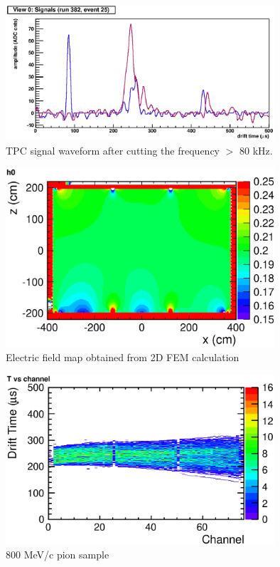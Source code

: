\documentclass{cernyrep}
\begin{document}
\begin{figure}[htbp]
 \begin{center}
  \includegraphics[width=100mm]{afterFFT.eps}
 \end{center}
 \caption{TPC signal waveform after cutting the frequency $>$ 80 kHz.}
 \label{Fig:afterFFT}
\end{figure}


\begin{figure}[htbp]
 \begin{center}
  \includegraphics[width=100mm]{2DFieldMap.eps}
 \end{center}
 \caption{Electric field map obtained from 2D FEM calculation}
 \label{fig:2DFieldMap}
\end{figure}

\begin{figure}[htbp]
 \begin{center}
  \includegraphics[width=100mm]{PionTrack.eps}
 \end{center}
 \caption{800 MeV/c pion sample}
 \label{fig:PionTrack}
\end{figure}
\end{document}
